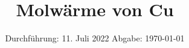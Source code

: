 

\subject{V47}
\title{Molwärme von Cu}
\date{%
  Durchführung: 11. Juli 2022
  \hspace{3em}
  Abgabe: \today
}



\maketitle
\thispagestyle{empty}
\tableofcontents
\newpage








\nocite{matplotlib}
\nocite{numpy}
\nocite{scipy}
\nocite{uncertainties}
\printbibliography{}


